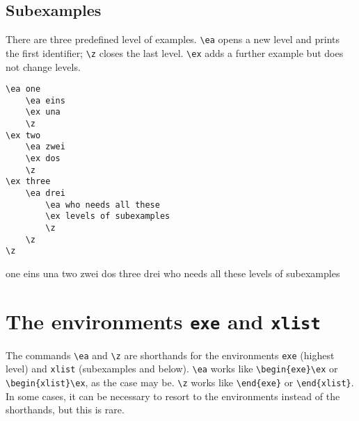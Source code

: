\documentclass[output=paper]{langscibook}
\newcommand{\cmd}[1]{\texttt{\textbackslash#1}}
\newcommand{\env}[1]{\texttt{#1}}
\begin{document}
\subsection{Subexamples}
There are three predefined level of examples. \cmd{ea} opens a new level and prints the first identifier; \cmd{z} closes the last level. \cmd{ex} adds a further example but does not change levels. 

\begin{minipage}{.55\textwidth}
\begin{lstlisting}
\ea one
    \ea eins
    \ex una
    \z
\ex two
    \ea zwei
    \ex dos
    \z
\ex three
    \ea drei
        \ea who needs all these
        \ex levels of subexamples
        \z
    \z
\z
 \end{lstlisting}
\end{minipage}
\parbox{.45\textwidth}{
\ea one
    \ea eins
    \ex una
    \z
\ex two
    \ea zwei
    \ex dos
    \z
\ex three
    \ea drei
        \ea who needs all these
        \ex levels of subexamples
        \z
    \z
\z
}

\section{The environments \texttt{exe} and \texttt{xlist}}
The commands \cmd{ea} and \cmd{z} are shorthands for the environments \env{exe} (highest level) and \env{xlist} (subexamples and below). \cmd{ea} works like \verb+\begin{exe}\ex+ or \verb+\begin{xlist}\ex+, as the case may be. \cmd{z} works like \verb+\end{exe}+ or \verb+\end{xlist}+. In some cases, it can be necessary to resort to the environments instead of the shorthands, but this is rare. 
\end{document}
